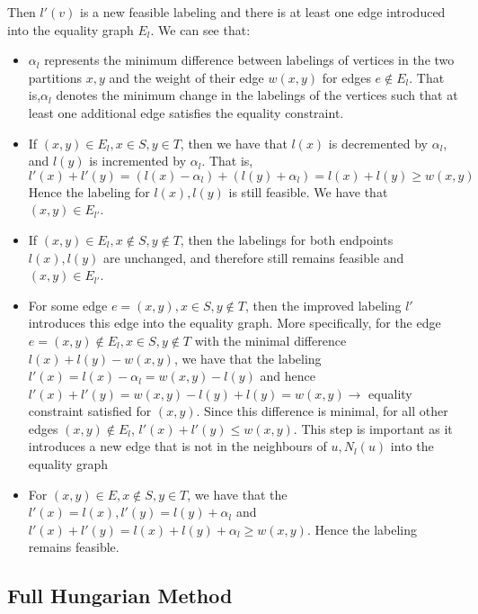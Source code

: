 \documentclass{article}
\begin{document}
Then $l'(v)$ is a new feasible labeling and there is at least one edge introduced into the equality graph $E_l$. We can see that:
\begin{itemize}
\item $\alpha_l$ represents the minimum difference between labelings of vertices in the two partitions $x, y$ and the weight of their edge $w(x, y)$ for edges $e \notin E_l$. That is,$ \alpha_l$ denotes the minimum change in the labelings of the vertices such that at least one additional edge satisfies the equality constraint.
\item If $(x, y) \in E_l, x \in S, y \in T$, then we have that $l(x)$ is decremented by $\alpha_l$, and $l(y)$ is incremented by $\alpha_l$. That is, $l'(x) + l'(y) = (l(x) - \alpha_l) + (l(y) + \alpha_l) = l(x) + l(y) \geq w(x, y)$ Hence the labeling for $l(x), l(y)$ is still feasible. We have that $(x, y) \in E_{l'}$.
\item If $(x, y) \in E_l, x \notin S, y \notin T$, then the labelings for both endpoints $l(x), l(y)$ are unchanged, and therefore still remains feasible and $(x, y) \in E_{l'}$.
\item For some edge $e = (x, y), x \in S, y \notin T$, then the improved labeling $l'$ introduces this edge into the equality graph. More specifically, for the edge $e = (x, y) \notin E_l, x \in S, y\notin T$ with the minimal difference $l(x) + l(y) - w(x, y)$, we have that the labeling $l'(x) = l(x) - \alpha_l = w(x, y) - l(y)$ and hence $l'(x) + l'(y) = w(x, y) - l(y) + l(y) = w(x, y) \rightarrow$ equality constraint satisfied for $(x, y)$. Since this difference is minimal, for all other edges $(x, y) \notin E_l$, $l'(x) + l'(y) \leq w(x, y)$. This step is important as it introduces a new edge that is not in the neighbours of $u, N_l(u)$ into the equality graph
\item For $(x, y) \in E, x \notin S, y \in T$, we have that the $l'(x) = l(x), l'(y) = l(y) + \alpha_l$ and $l'(x) + l'(y) = l(x) + l(y) + \alpha_l \geq w(x, y)$. Hence the labeling remains feasible.
\end{itemize}
\pagebreak
\subsection{Full Hungarian Method}
\end{document}

